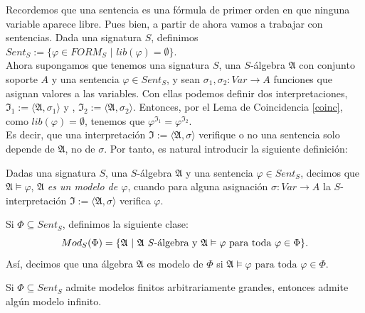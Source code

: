 Recordemos que una sentencia es una fórmula de primer orden en que ninguna variable aparece libre. Pues bien, a partir de ahora vamos a trabajar con sentencias. Dada una signatura $S$, definimos $Sent_S:=\{\varphi\in FORM_S\, \, |\, \, lib(\varphi)=\emptyset\}$.\\

Ahora supongamos que tenemos una signatura $S$, una $S$-álgebra $\mathfrak{A}$ con conjunto soporte $A$ y una sentencia $\varphi\in Sent_S$, y sean $\sigma_1,\sigma_2: Var \rightarrow A$ funciones que asignan valores a las variables. Con ellas podemos definir dos interpretaciones, $\mathfrak{I}_1 := \langle \mathfrak{A}, \sigma_1 \rangle$ y , $\mathfrak{I}_2 := \langle \mathfrak{A}, \sigma_2 \rangle$. Entonces, por el Lema de Coincidencia \ref{coinc}, como $lib(\varphi)=\emptyset$, tenemos que $\varphi^{\mathfrak{I}_1}=\varphi^{\mathfrak{I}_2}$.\\

Es decir, que una interpretación $\mathfrak{I} := \langle \mathfrak{A}, \sigma \rangle$ verifique o no una sentencia solo depende de $\mathfrak{A}$, no de $\sigma$. Por tanto, es natural introducir la siguiente definición:

\begin{definition}
Dadas una signatura $S$, una $S$-álgebra $\mathfrak{A}$ y una sentencia $\varphi\in Sent_S$, decimos que $\mathfrak{A}\vDash\varphi$, $\mathfrak{A}$\textit{ es un modelo de $\varphi$}, cuando para alguna asignación $\sigma : Var \rightarrow A$ la $S$-interpretación $\mathfrak{I} := \langle \mathfrak{A}, \sigma \rangle$ verifica $\varphi$.
\end{definition}

\begin{definition}
Si $\Phi\subseteq Sent_S$, definimos la siguiente clase:
\[Mod_S(\Phi)=\{\mathfrak{A}\, \, |\, \, \mathfrak{A} \text{ \textit{S}-álgebra y }\mathfrak{A}\vDash\varphi \text{ para toda $\varphi\in\Phi$}\}.\]
Así, decimos que una álgebra $\mathfrak{A}$ es modelo de $\Phi$ si $\mathfrak{A}\vDash\varphi \text{ para toda $\varphi\in\Phi$}$. \\
\end{definition}

\begin{theorem}\label{fintoinf}
Si $\Phi\subseteq Sent_S$ admite modelos finitos arbitrariamente grandes, entonces admite algún modelo infinito.
\end{theorem}

